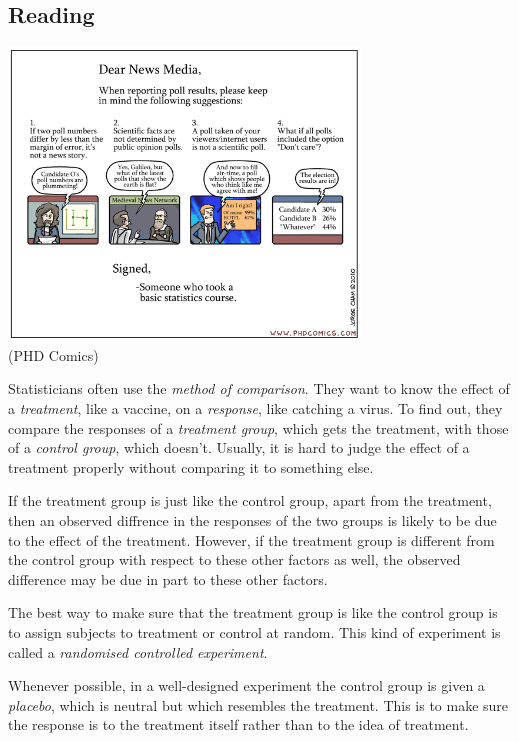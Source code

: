 



\subsection*{Reading}

\begin{center}
  \includegraphics[width=0.7\textwidth]{badstats}\\
  \small{(PHD Comics)}
\end{center}


Statisticians often use the \emph{method of comparison}. They want to know the effect of a \emph{treatment}, like a vaccine, on a \emph{response},
like catching a virus. To find out, they compare the responses of a \emph{treatment group}, which gets the treatment, with those of a \emph{control
group}, which doesn't. Usually, it is hard to judge the effect of a treatment properly without comparing it to something else.

If the treatment group is just like the control group, apart from the treatment, then an observed diffrence in the responses of the two groups
is likely to be due to the effect of the treatment. However, if the treatment group is different from the control group with respect to these
other factors as well, the observed difference may be due in part to these other factors.

The best way to make sure that the treatment group is like the control group is to assign subjects to treatment or control at random. This kind
of experiment is called a \emph{randomised controlled experiment}.

Whenever possible, in a well-designed experiment the control group is given a \emph{placebo}, which is neutral but which resembles the treatment.
This is to make sure the response is to the treatment itself rather than to the idea of treatment.

